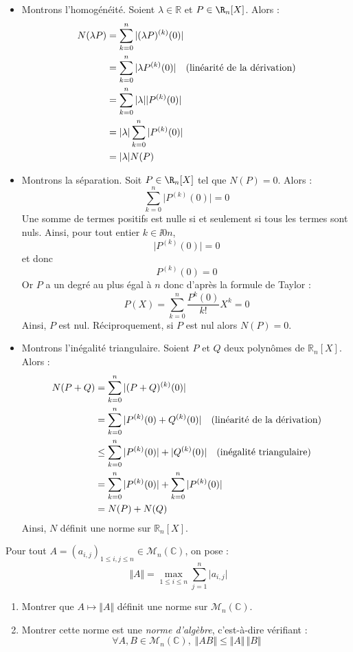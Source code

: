 \documentclass[a4paper,twoside,french,11pt]{VcCours}
\begin{document}
\begin{itemize}
\item Montrons l'homogénéité. Soient $\lambda \in \mathbb{R}$ et $P \in  \R_n[X ]$. Alors :
\begin{align*}
N(\lambda P) & =  \sum_{k = 0}^{ n } \vert (\lambda P)^{(k)} (0) \vert  \\
& =  \sum_{k = 0}^{ n }  \vert \lambda P^{(k)} (0) \vert \quad \hbox{(linéarité de la dérivation)} \\
& =  \sum_{k = 0}^{ n } \vert \lambda \vert \vert P^{(k)} (0) \vert \\
& = \vert \lambda \vert \sum_{k = 0}^{ n } \vert P^{(k)} (0) \vert \\
& = \vert \lambda \vert N(P) 
\end{align*}
\item Montrons la séparation. Soit $P \in  \R_n[X ]$ tel que $N(P)=0$. Alors :  
$$ \sum_{k = 0}^{ n } \vert P^{(k)} (0) \vert =0$$
Une somme de termes positifs est nulle si et seulement si tous les termes sont nuls. Ainsi, pour tout entier $k \in \ii{0}{n}$,
$$  \vert P^{(k)} (0) \vert = 0$$
et donc 
$$   P^{(k)} (0)  = 0$$
Or $P$ a un degré au plus égal à $n$ donc d'après la formule de Taylor :
$$ P(X) = \sum_{k=0}^n \dfrac{P^{k}(0)}{k!} X^k = 0$$
Ainsi, $P$ est nul. Réciproquement, si $P$ est nul alors $N(P)=0$.
\item Montrons l'inégalité triangulaire. Soient $P$ et $Q$ deux polynômes de $\mathbb{R}_n[X]$. Alors :
\begin{align*}
N(P+Q) & = \sum_{k = 0}^{ n } \vert (P+Q)^{(k)} (0) \vert \\
& = \sum_{k = 0}^{ n } \vert P^{(k)} (0) +  Q^{(k)} (0) \vert \quad \hbox{(linéarité de la dérivation)} \\
& \leq \sum_{k = 0}^{ n } \vert P^{(k)} (0) \vert +  \vert Q^{(k)} (0) \vert \quad \hbox{(inégalité triangulaire)} \\
& = \sum_{k = 0}^{ n } \vert P^{(k)} (0) \vert + \sum_{k = 0}^{ n } \vert P^{(k)} (0) \vert \\
& = N(P) + N(Q)
\end{align*}
Ainsi, $N$ définit une norme sur $\mathbb{R}_n[X]$.
\end{itemize}


\begin{Exercice}{} Pour tout $A = (a_{i,j})_{1 \leq i,j \leq n} \in \mathcal{M}_{n}(\mathbb{C})$, on pose :
  \[
  \Vert A \Vert = \max_{1 \leq i \leq n} \sum_{j = 1}^{n}  \vert a_{i,j} \vert
  \]
  \begin{enumerate}
  \item Montrer que $A \mapsto \Vert A \Vert$ définit une norme sur $\mathcal{M}_{n}(\mathbb{C})$.
  \item Montrer cette norme est une \textit{norme d'algèbre}, c'est-à-dire vérifiant :
    \[
    \forall A,B \in \mathcal{M}_{n}(\mathbb{C}),  \; \Vert AB \Vert \leq \Vert A \Vert \, \Vert B \Vert
    \]
  \end{enumerate}
\end{Exercice}
\end{document}
